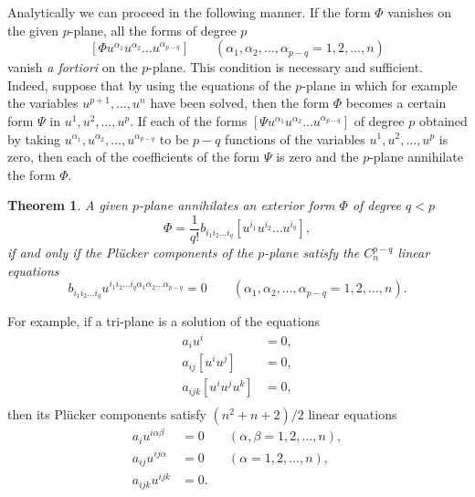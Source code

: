 \documentclass[leqno,11pt]{book}
\numberwithin{equation}{chapter}
\theoremstyle{shape1}
\newtheorem*{thm*}{\hspace{15pt}Theorem}
\theoremstyle{shape0}
\theoremstyle{shape2}
\theoremstyle{definition}
\begin{document}
Analytically we can proceed in the following manner. If the form $\Phi$ vanishes on the given $p$-plane, all the forms of degree $p$
\[
[\Phi u^{\alpha_{1}}u^{\alpha_{2}}\dots u^{\alpha_{p-q}}]\qquad(\alpha_{1},\alpha_{2},\dots,\alpha_{p-q}=1,2,\dots,n)
\]
vanish \emph{a fortiori} on the $p$-plane. This condition is necessary and sufficient. Indeed, suppose that by using the equations of the $p$-plane in which for example the variables $u^{p+1},\dots,u^{n}$ have been solved, then the form $\Phi$ becomes a certain form $\Psi$ in $u^{1},u^{2},\dots,u^{p}$. If each of the forms $[\Psi u^{\alpha_{1}}u^{\alpha_{2}}\dots u^{\alpha_{p-q}}]$ of degree $p$ obtained by taking $u^{\alpha_{1}},u^{\alpha_{2}},\dots,u^{\alpha_{p-q}}$ to be $p-q$ functions of the variables $u^{1},u^{2},\dots,u^{p}$ is zero, then each of the coefficients of the form $\Psi$ is zero and the $p$-plane annihilate the form $\Phi$.
\begin{thm*}
  A given $p$-plane  annihilates an exterior form $\Phi$ of degree $q<p$
\[
\Phi=\frac{1}{q!}b_{i_{1}i_{2}\dots i_{q}}[u^{i_{1}}u^{i_{2}}\dots u^{i_{q}}],
\]
if and only if the Pl\"ucker components of the $p$-plane satisfy the $C_{n}^{p-q}$ linear equations
\[
b_{i_{1}i_{2}\dots i_{q}}u^{i_{1}i_{2}\dots i_{q}\alpha_{1}\alpha_{2}\dots \alpha_{p-q}}=0\qquad (\alpha_{1},\alpha_{2},\dots,\alpha_{p-q}=1,2,\dots,n).
\]
\end{thm*}

For example, if a tri-plane is a solution of the equations
\begin{align*}
  a_{i}u^{i}&=0,\\
  a_{ij}[u^{i}u^{j}]&=0,\\
  a_{ijk}[u^{i}u^{j}u^{k}]&=0,\\
\end{align*}
then its Pl\"ucker components satisfy $({n^{2}+n+2})/{2}$ linear equations
\begin{align*}
  a_{i}u^{i\alpha\beta}&=0&&(\alpha,\beta=1,2,\dots,n),\\
  a_{ij}u^{ij\alpha}&=0&&(\alpha=1,2,\dots,n),\\
  a_{ijk}u^{ijk}&=0.&
\end{align*}
\end{document}
